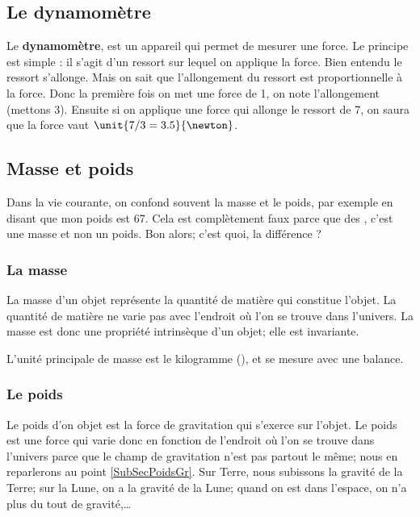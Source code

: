 \documentclass[a4paper,12pt]{book}
\theoremstyle{mes_exemples}	\newtheorem{exemple}[numtho]{Exemple}
\theoremstyle{mes_tho}
\newcommand{\defe}[2]{\textbf{#1}\index{#2}}
\begin{document}
\subsection{Le dynamomètre}

Le \defe{dynamomètre}{dynamomètre}, est un appareil qui permet de mesurer une force. Le principe est simple : il s'agit d'un ressort sur lequel on applique la force. Bien entendu le ressort s'allonge. Mais on sait que l'allongement du ressort est proportionnelle à la force. Donc la première fois on met une force de \unit{1}{\newton}, on note l'allongement (mettons \unit{3}{\centi\meter}). Ensuite si on applique une force qui allonge le ressort de \unit{7}{\centi\meter}, on saura que la force vaut $\unit{7/3=3.5}{\newton}$.

\subsection{Masse et poids}

Dans la vie courante, on confond souvent la masse et le poids, par exemple en disant que \og mon poids est \unit{67}{\kilo\gram}\fg. Cela est complètement faux parce que des \kilo\gram, c'est une masse et non un poids. Bon alors; c'est quoi, la différence ?

 
\subsubsection{La masse}
 La masse d'un objet représente la quantité de matière qui constitue l'objet. La quantité de matière ne varie pas avec l'endroit où l'on se trouve dans l'univers. La masse est donc une propriété intrinsèque d'un objet; elle est invariante.
 
  L'unité principale de masse est le kilogramme (\kilo\gram), et se mesure avec une balance.
 
 
\subsubsection{Le poids}	\label{SubSubSecPoids}
Le poids d'on objet est la force de gravitation qui s'exerce sur l'objet. Le poids est une force qui varie donc en fonction de l'endroit où l'on se trouve dans l'univers parce que le champ de gravitation n'est pas partout le même; nous en reparlerons au point \ref{SubSecPoidsGr}. Sur Terre, nous subissons la gravité de la Terre; sur la Lune, on a la gravité de la Lune; quand on est dans l'espace, on n'a plus du tout de gravité,\ldots
\end{document}
